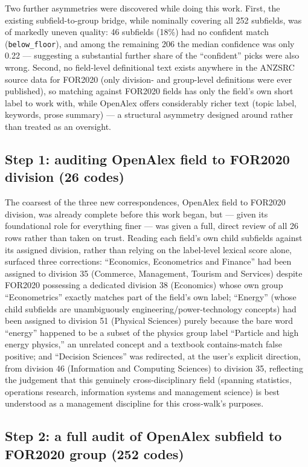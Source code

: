 \documentclass[11pt]{article}
\begin{document}
Two further asymmetries were discovered while doing this work. First, the existing
subfield-to-group bridge, while nominally covering all 252 subfields, was of markedly
uneven quality: 46 subfields (18\%) had no confident match (\texttt{below\_floor}), and
among the remaining 206 the median confidence was only 0.22 --- suggesting a substantial
further share of the ``confident'' picks were also wrong. Second, no field-level
definitional text exists anywhere in the ANZSRC source data for FOR2020 (only division-
and group-level definitions were ever published), so matching against FOR2020 fields has
only the field's own short label to work with, while OpenAlex offers considerably richer
text (topic label, keywords, prose summary) --- a structural asymmetry designed around
rather than treated as an oversight.

\subsection{Step 1: auditing OpenAlex field to FOR2020 division (26 codes)}

The coarsest of the three new correspondences, OpenAlex field to FOR2020 division, was
already complete before this work began, but --- given its foundational role for
everything finer --- was given a full, direct review of all 26 rows rather than taken on
trust. Reading each field's own child subfields against its assigned division, rather
than relying on the label-level lexical score alone, surfaced three corrections:
``Economics, Econometrics and Finance'' had been assigned to division 35 (Commerce,
Management, Tourism and Services) despite FOR2020 possessing a dedicated division 38
(Economics) whose own group ``Econometrics'' exactly matches part of the field's own
label; ``Energy'' (whose child subfields are unambiguously engineering/power-technology
concepts) had been assigned to division 51 (Physical Sciences) purely because the bare
word ``energy'' happened to be a subset of the physics group label ``Particle and high
energy physics,'' an unrelated concept and a textbook contains-match false positive; and
``Decision Sciences'' was redirected, at the user's explicit direction, from division 46
(Information and Computing Sciences) to division 35, reflecting the judgement that this
genuinely cross-disciplinary field (spanning statistics, operations research,
information systems and management science) is best understood as a management
discipline for this cross-walk's purposes.

\subsection{Step 2: a full audit of OpenAlex subfield to FOR2020 group (252 codes)}
\end{document}
